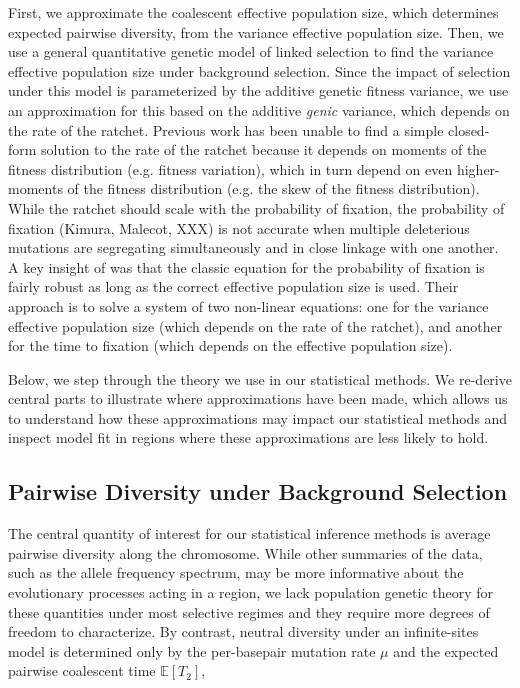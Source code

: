 \documentclass[11pt]{article}
\newcommand{\E}{\mathbb{E}}
\begin{document}
First, we approximate the coalescent effective population size, which
determines expected pairwise diversity, from the variance effective population
size. Then, we use a general quantitative genetic model of linked selection to
find the variance effective population size under background selection. Since
the impact of selection under this model is parameterized by the additive
genetic fitness variance, we use an approximation for this based on the
additive \emph{genic} variance, which depends on the rate of the ratchet.
Previous work has been unable to find a simple closed-form solution to the rate
of the ratchet because it depends on moments of the fitness distribution (e.g.
fitness variation), which in turn depend on even higher-moments of the fitness
distribution (e.g. the skew of the fitness distribution). While the ratchet
should scale with the probability of fixation, the probability of fixation
(Kimura, Malecot, XXX) is not accurate when multiple deleterious mutations are
segregating simultaneously and in close linkage with one another. A key insight
of \textcite{Santiago2016-mu} was that the classic equation for the probability
of fixation is fairly robust as long as the correct effective population size
is used. Their approach is to solve a system of two non-linear equations: one
for the variance effective population size (which depends on the rate of the
ratchet), and another for the time to fixation (which depends on the effective
population size).

Below, we step through the theory we use in our statistical methods. We
re-derive central parts to illustrate where approximations have been made,
which allows us to understand how these approximations may impact our
statistical methods and inspect model fit in regions where these approximations
are less likely to hold.

\subsection*{Pairwise Diversity under Background Selection}

The central quantity of interest for our statistical inference methods is
average pairwise diversity along the chromosome. While other summaries of the
data, such as the allele frequency spectrum, may be more informative about the
evolutionary processes acting in a region, we lack population genetic theory
for these quantities under most selective regimes and they require more degrees
of freedom to characterize. By contrast, neutral diversity under an
infinite-sites model is determined only by the per-basepair mutation rate $\mu$
and the expected pairwise coalescent time $\E[T_2]$,
\end{document}
